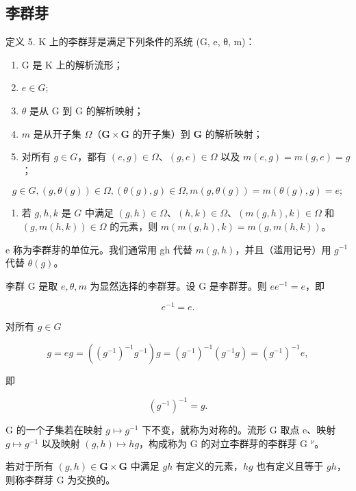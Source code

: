 \subsection{李群芽}

定义 5. K 上的李群芽是满足下列条件的系统 (G, e, θ, m)：

\begin{enumerate}
\def\labelenumi{(\roman{enumi})}
\item
  G 是 K 上的解析流形；
\item
  \(e \in G;\)
\item
  \(\theta\) 是从 G 到 G 的解析映射；
\item
  \(m\) 是从开子集 \(\Omega\)（\(\mathbf{G} \times \mathbf{G}\) 的开子集）到 \(\mathbf{G}\) 的解析映射；
\item
  对所有 \(g \in G\)，都有 \((e, g) \in \Omega\)、\((g, e) \in \Omega\) 以及 \(m(e, g) = m(g, e) = g\)；
\end{enumerate}

\[
g \in G, (g, \theta (g)) \in \Omega , (\theta (g), g) \in \Omega , m (g, \theta (g)) = m (\theta (g), g) = e;
\]

\begin{enumerate}
\def\labelenumi{(\roman{enumi})}
\setcounter{enumi}{6}
\tightlist
\item
  若 \(g, h, k\) 是 \(G\) 中满足 \((g, h) \in \Omega\)、\((h, k) \in \Omega\)、\((m(g, h), k) \in \Omega\) 和 \((g, m(h, k)) \in \Omega\) 的元素，则 \(m(m(g, h), k) = m(g, m(h, k))\)。
\end{enumerate}

e 称为李群芽的单位元。我们通常用 gh 代替 \(m(g, h)\)，并且（滥用记号）用 \(g^{-1}\) 代替 \(\theta(g)\)。

李群 G 是取 \(e, \theta, m\) 为显然选择的李群芽。设 G 是李群芽。则 \(ee^{-1} = e\)，即

\[
e ^ {- 1} = e.\tag{8}
\]

对所有 \(g\in G\)

\[
g = e g = ((g ^ {- 1}) ^ {- 1} g ^ {- 1}) g = (g ^ {- 1}) ^ {- 1} (g ^ {- 1} g) = (g ^ {- 1}) ^ {- 1} e,
\]

即

\[
(g ^ {- 1}) ^ {- 1} = g.\tag{9}
\]

G 的一个子集若在映射 \(g \mapsto g^{-1}\) 下不变，就称为对称的。流形 G 取点 e、映射 \(g \mapsto g^{-1}\) 以及映射 \((g, h) \mapsto hg\)，构成称为 G 的对立李群芽的李群芽 G \(^{\nu}\)。

若对于所有 \((g,h)\in \mathbf{G}\times \mathbf{G}\) 中满足 \(gh\) 有定义的元素，\(hg\) 也有定义且等于 \(gh\)，则称李群芽 G 为交换的。

